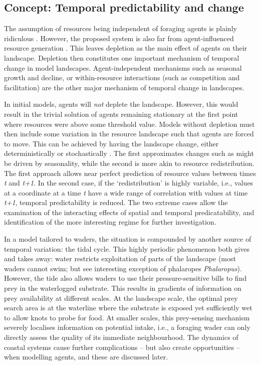 \subsection{Concept: Temporal predictability and change}

The assumption of resources being independent of foraging agents is
plainly ridiculous
\citep{vandekoppel1997, jefferies2006, bijleveld2015}. However, the
proposed system is also far from agent-influenced resource generation
\citep[see e.g.][]{leroux2018}. This leaves depletion as the main effect
of agents on their landscape. Depletion then constitutes one important
mechanism of temporal change in model landscapes. Agent-independent
mechanisms such as seasonal growth and decline, or within-resource
interactions (such as competition and facilitation) are the other major
mechanism of temporal change in landscapes.

In initial models, agents will \emph{not} deplete the landscape.
However, this would result in the trivial solution of agents remaining
stationary at the first point where resources were above some threshold
value. Models without depletion must then include some variation in the
resource landscape such that agents are forced to move. This can be
achieved by having the landscape change, either deterministically or
stochastically \citep[see parellel with][]{botero2015}. The first
approximates changes such as might be driven by seasonality, while the
second is more akin to resource redistribution. The first approach
allows near perfect prediction of resource values between times \emph{t}
and \emph{t+1}. In the second case, if the `redistribution' is highly
variable, i.e., values at a coordinate at a time \emph{t} have a wide
range of correlation with values at time \emph{t+1}, temporal
predictability is reduced. The two extreme cases allow the examination
of the interacting effects of spatial and temporal predicatability, and
identification of the more interesting regime for further investigation.

In a model tailored to waders, the situation is compounded by another
source of temporal variation: the tidal cycle. This highly periodic
phenomenon both gives and takes away: water restricts exploitation of
parts of the landscape (most waders cannot swim; but see interesting
exception of phalaropes \emph{Phalaropus}). However, the tide also
allows waders to use their pressure-sensitive bills \citep{piersma1998}
to find prey in the waterlogged substrate. This results in gradients of
information on prey availability at different scales. At the landscape
scale, the optimal prey search area is at the waterline where the
substrate is exposed yet sufficiently wet to allow knots to probe for
food. At smaller scales, this prey-sensing mechanism severely localises
information on potential intake, i.e., a foraging wader can only
directly assess the quality of its immediate neighbourhood. The dynamics
of coastal systems cause further complications -- but also create
opportunities -- when modelling agents, and these are discussed later.

